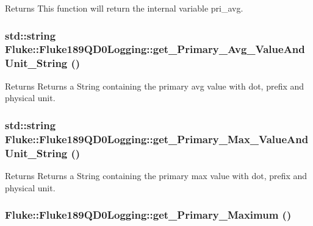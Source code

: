 \label{classFluke_1_1Fluke189QD0Logging_a29473a5a7d016d020f0948fcf3e31e50}
\begin{DoxyReturn}{Returns}
This function will return the internal variable pri\_\-avg. 
\end{DoxyReturn}
\hypertarget{classFluke_1_1Fluke189QD0Logging_a2df10d36428d5950a20d5eb9b24615c0}{
\subsubsection[{get\_\-Primary\_\-Avg\_\-ValueAndUnit\_\-String}]{\setlength{\rightskip}{0pt plus 5cm}std::string Fluke::Fluke189QD0Logging::get\_\-Primary\_\-Avg\_\-ValueAndUnit\_\-String ()}}
\label{classFluke_1_1Fluke189QD0Logging_a2df10d36428d5950a20d5eb9b24615c0}
\begin{DoxyReturn}{Returns}
Returns a String containing the primary avg value with dot, prefix and physical unit. 
\end{DoxyReturn}
\hypertarget{classFluke_1_1Fluke189QD0Logging_ad4b792edac72623811391b8973a7feb9}{
\subsubsection[{get\_\-Primary\_\-Max\_\-ValueAndUnit\_\-String}]{\setlength{\rightskip}{0pt plus 5cm}std::string Fluke::Fluke189QD0Logging::get\_\-Primary\_\-Max\_\-ValueAndUnit\_\-String ()}}
\label{classFluke_1_1Fluke189QD0Logging_ad4b792edac72623811391b8973a7feb9}
\begin{DoxyReturn}{Returns}
Returns a String containing the primary max value with dot, prefix and physical unit. 
\end{DoxyReturn}
\hypertarget{classFluke_1_1Fluke189QD0Logging_a7da9ac7b5617e427cdfc1b09d6bd4373}{
\subsubsection[{get\_\-Primary\_\-Maximum}]{ Fluke::Fluke189QD0Logging::get\_\-Primary\_\-Maximum ()}}
